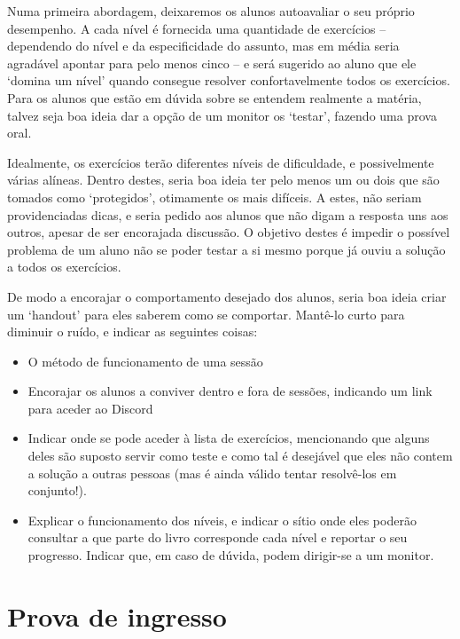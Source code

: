 \documentclass{article}
\begin{document}
	Numa primeira abordagem, deixaremos os alunos autoavaliar o seu próprio desempenho. A cada nível é fornecida uma quantidade de exercícios -- dependendo do nível e da especificidade do assunto, mas em média seria agradável apontar para pelo menos cinco -- e será sugerido ao aluno que ele `domina um nível' quando consegue resolver confortavelmente todos os exercícios. Para os alunos que estão em dúvida sobre se entendem realmente a matéria, talvez seja boa ideia dar a opção de um monitor os `testar', fazendo uma prova oral.
	
	Idealmente, os exercícios terão diferentes níveis de dificuldade, e possivelmente várias alíneas. Dentro destes, seria boa ideia ter pelo menos um ou dois que são tomados como `protegidos', otimamente os mais difíceis. A estes, não seriam providenciadas dicas, e seria pedido aos alunos que não digam a resposta uns aos outros, apesar de ser encorajada discussão. O objetivo destes é impedir o possível problema de um aluno não se poder testar a si mesmo porque já ouviu a solução a todos os exercícios.
	
	De modo a encorajar o comportamento desejado dos alunos, seria boa ideia criar um `handout' para eles saberem como se comportar. Mantê-lo curto para diminuir o ruído, e indicar as seguintes coisas:
	
	\begin{itemize}
	\item O método de funcionamento de uma sessão
	
	\item Encorajar os alunos a conviver dentro e fora de sessões, indicando um link para aceder ao Discord
	
	\item Indicar onde se pode aceder à lista de exercícios, mencionando que alguns deles são suposto servir como teste e como tal é desejável que eles não contem a solução a outras pessoas (mas é ainda válido tentar resolvê-los em conjunto!).
	
	\item Explicar o funcionamento dos níveis, e indicar o sítio onde eles poderão consultar a que parte do livro corresponde cada nível e reportar o seu progresso. Indicar que, em caso de dúvida, podem dirigir-se a um monitor.
	\end{itemize}
	
	\section{Prova de ingresso}
	
\end{document}
